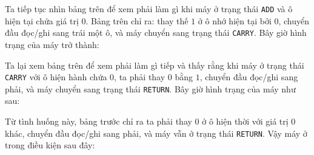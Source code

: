 Ta tiếp tục nhìn bảng trên để xem phải làm gì khi máy ở trạng thái \texttt{ADD} và ô hiện
tại chứa giá trị $0$. Bảng trên chỉ ra: thay thế $1$ ở ô nhớ hiện tại bởi $0$, chuyển đầu
đọc/ghi sang trái một ô, và máy chuyển sang trạng thái \texttt{CARRY}. Bây giờ hình trạng
của máy trở thành:
\begin{center}
\end{center}

Ta lại xem bảng trên để xem phải làm gì tiếp và thấy rằng khi máy ở trạng thái
\texttt{CARRY} với ô hiện hành chứa $0$, ta phải thay $0$ bằng $1$, chuyển đầu đọc/ghi
sang phải, và máy chuyển sang trạng thái \texttt{RETURN}. Bây giờ hình trạng của máy như
sau:
\begin{center}
\end{center}


Từ tình huống này, bảng trước chỉ ra ta phải thay $0$ ở ô hiện thời với giá trị $0$ khác,
chuyển đầu đọc/ghi sang phải, và máy vẫn ở trạng thái \texttt{RETURN}. Vậy máy ở trong
điều kiện sau đây:
\begin{center}
\end{center}


